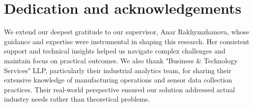 \chapter{Dedication and acknowledgements}
\begin{SingleSpace}
We extend our deepest gratitude to our supervisor, Anar Rakhymzhanova, whose guidance and expertise were instrumental in shaping this research. Her consistent support and technical insights helped us navigate complex challenges and maintain focus on practical outcomes. We also thank "Business \& Technology Services" LLP, particularly their industrial analytics team, for sharing their extensive knowledge of manufacturing operations and sensor data collection practices. Their real-world perspective ensured our solution addressed actual industry needs rather than theoretical problems.
\end{SingleSpace}
\clearpage
